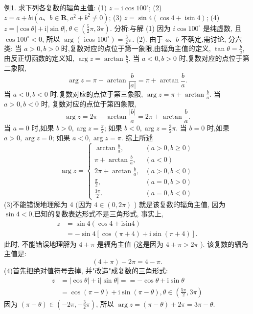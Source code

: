 例1. 求下列各复数的辐角主值:
(1) $z=\mathrm{i} \cos 100^{\circ}$;
(2) $z=a+b \mathrm{i}\left(a 、 b \in \mathbf{R}, a^2+b^2 \neq 0\right)$;
(3) $z=\sin 4(\cos 4+\operatorname{isin} 4)$;
(4) $z=|\cos \theta|+\mathrm{i}|\sin \theta|, \theta \in\left(\frac{5}{2} \pi, 3 \pi\right)$.
分析:与解 (1) 因为 $i \cos 100^{\circ}$ 是纯虚数, 且 $\cos 100^{\circ}<0$, 所以
$\arg \left(\right.$ icos $\left.100^{\circ}\right)=\frac{3}{2} \pi$.
(2). 由于 $a 、 b$ 不确定,需讨论, 分六类:
当 $a>0, b>0$ 时,复数对应的点位于第一象限,由辐角主值的定义, $\tan \theta=\frac{b}{a}$, 由反正切函数的定义知, $\arg z=\arctan \frac{b}{a}$.
当 $a<0, b>0$ 时,复数对应的点位于第二象限,
$$
\arg z=\pi-\arctan \frac{b}{|a|}=\pi+\arctan \frac{b}{a} .
$$
当 $a<0, b<0$ 时,复数对应的点位于第三象限, $\arg z=\pi+\arctan \frac{b}{a}$.
当 $a>0, b<0$ 时, 复数对应的点位于第四象限,
$$
\arg z=2 \pi-\arctan \frac{|b|}{a}=2 \pi+\arctan \frac{b}{a} .
$$
当 $a=0$ 时,如果 $b>0, \arg z=\frac{\pi}{2}$; 如果 $b<0, \arg z=\frac{3}{2} \pi$.
当 $b=0$ 时,如果 $a>0, \arg z=0$; 如果 $a<0, \arg z=\pi$.
综上所述
$$
\arg z= \begin{cases}\arctan \frac{b}{a}, & (a>0, b \geqslant 0) \\ \pi+\arctan \frac{b}{a}, & (a<0) \\ 2 \pi+\arctan \frac{b}{a}, & (a>0, b<0) \\ \frac{\pi}{2}, & (a=0, b>0) \\ \frac{3 \pi}{2} . & (a=0, b<0)\end{cases}
$$
(3)不能错误地理解为 4 (因为 $4 \in(0,2 \pi)$ ) 就是该复数的辐角主值, 因为 $\sin 4<0$,已知的复数表达形式不是三角形式, 事实上,
$$
\begin{aligned}
z & =\sin 4(\cos 4+\mathrm{isin} 4) \\
& =-\sin 4[\cos (\pi+4)+\mathrm{i} \sin (\pi+4)] .
\end{aligned}
$$
此时, 不能错误地理解为 $4+\pi$ 是辐角主值 (这是因为 $4+\pi>2 \pi$ ). 该复数的辐角主值是:
$$
(4+\pi)-2 \pi=4-\pi .
$$
(4)首先把绝对值符号去掉, 并"改造"成复数的三角形式:
$$
\begin{aligned}
z & =|\cos \theta|+\mathrm{i}|\sin \theta|==-\cos \theta+\mathrm{i} \sin \theta \\
& =\cos (\pi-\theta)+\mathrm{i} \sin (\pi-\theta), \theta \in\left(\frac{5 \pi}{2}, 3 \pi\right)
\end{aligned}
$$
因为 $(\pi-\theta) \in\left(-2 \pi,-\frac{3}{2} \pi\right)$, 所以 $\arg z=(\pi-\theta)+2 \pi=3 \pi-\theta$.



